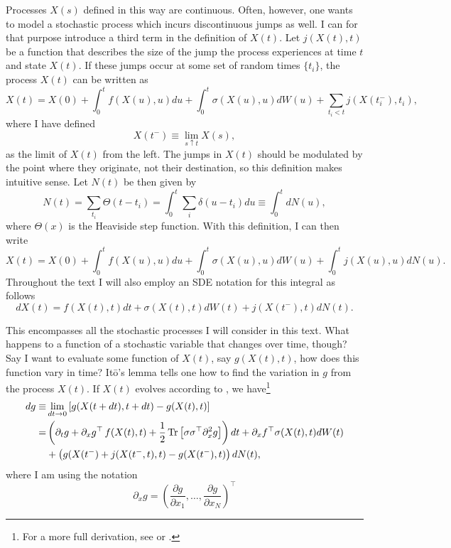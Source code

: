 Processes $X(s)$ defined in this way are continuous. Often, however, one wants to model a stochastic process which incurs discontinuous jumps as well. I can for that purpose 
introduce a third term in the definition of $X(t)$. Let $j(X(t),t)$ be a function that describes the size of the jump the process experiences at time $t$ and state $X(t)$. 
If these jumps occur at some set of random times $\{t_i\}$, the process $X(t)$ can be written as
\[
X(t) = X(0) + \int_0^t f\left(X(u),u\right) du + \int_0^t \sigma\left(X(u),u\right) dW(u) + \sum_{t_i <t} j\left(X(t_i^-),t_i\right),
\]
where I have defined
$$
X(t^-) \equiv \lim_{s \uparrow t} X(s),
$$
as the limit of $X(t)$ from the left. The jumps in $X(t)$ should be modulated by the point where they originate, not their
destination, so this definition makes intuitive sense.
Let $N(t)$ be then given by
\[
N(t) = \sum_{t_i} \Theta(t-t_i) = \int_0^t \sum_i \delta(u-t_i) du\equiv \int_0^t dN(u), 
\]
where $\Theta(x)$ is the Heaviside step function. With this definition, I can then write
\[
X(t) = X(0) + \int_0^t f\left(X(u),u\right) du + \int_0^t \sigma\left(X(u),u\right) dW(u) + \int_0^t j\left(X(u),u\right) dN(u).
\]
Throughout the text I will also employ an SDE notation for this integral as follows
\begin{equation}
\label{eq:full_stoc}
dX(t) = f\left(X(t),t\right) dt + \sigma\left(X(t),t\right) dW(t) + j\left(X(t^-),t\right) dN(t).
\end{equation}
\par
This encompasses all the stochastic processes I will consider in this text. What happens to a function of a stochastic variable that changes over time, though? Say I want to evaluate
some function of $X(t)$, say $g(X(t),t)$, how does this function vary in time? It\=o's lemma tells one how to find the variation in $g$ from the process $X(t)$. If $X(t)$ evolves according
 to , we have\footnote{For a more full derivation, see  or .}
\begin{align*}
 dg \equiv& \lim_{dt \to 0} \left[g(X(t+dt),t+dt) - g(X(t),t)\right]\\
 =& \left(\partial_t g + \partial_x g^\top\, f(X(t),t) +\frac{1}{2}\operatorname{Tr}\left[ \sigma\sigma^\top \partial^2_x g\right]\right) dt+ \partial_x f^\top \sigma(X(t),t) dW(t) \\
 &+ \left(g(X(t^-)+j(X(t^-,t),t)-g(X(t^-),t)\right)dN(t),
 \end{align*}
 where I am using the notation
 $$\partial_x g = \left(\frac{\partial g}{\partial x_1},\ldots, \frac{\partial g}{\partial x_N}\right)^\top$$
